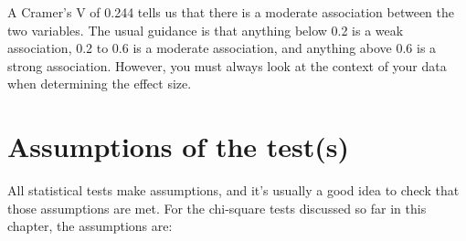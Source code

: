 \documentclass[
]{book}
\theoremstyle{definition}
\theoremstyle{definition}
\theoremstyle{definition}
\theoremstyle{definition}
\theoremstyle{remark}
\begin{document}
A Cramer's V of 0.244 tells us that there is a moderate association between the two variables. The usual guidance is that anything below 0.2 is a weak association, 0.2 to 0.6 is a moderate association, and anything above 0.6 is a strong association. However, you must always look at the context of your data when determining the effect size.

\hypertarget{chisqassumptions}{%
\section{Assumptions of the test(s)}\label{chisqassumptions}}

All statistical tests make assumptions, and it's usually a good idea to check that those assumptions are met. For the chi-square tests discussed so far in this chapter, the assumptions are:
\end{document}

